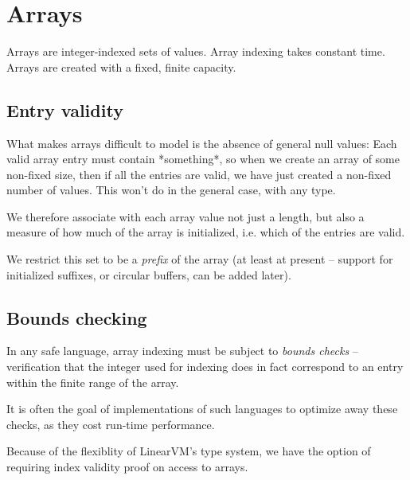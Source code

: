 \documentclass[a4paper]{book}
\begin{document}

\chapter{Arrays}

Arrays are integer-indexed sets of values.
Array indexing takes constant time.
Arrays are created with a fixed, finite capacity.

\section{Entry validity}

What makes arrays difficult to model is the absence of general null values:
Each valid array entry must contain *something*, so when we create an
array of some non-fixed size, then if all the entries are valid, we
have just created a non-fixed number of values.
This won't do in the general case, with any type.

We therefore associate with each array value not just a length, but
also a measure of how much of the array is initialized, i.e. which of
the entries are valid.

We restrict this set to be a \emph{prefix} of the array (at least at
present -- support for initialized suffixes, or circular buffers, can
be added later).

\section{Bounds checking}
In any safe language, array indexing must be subject to \emph{bounds checks}
-- verification that the integer used for indexing does in fact correspond to
an entry within the finite range of the array.

It is often the goal of implementations of such languages to optimize
away these checks, as they cost run-time performance.

Because of the flexiblity of LinearVM's type system, we have the option
of requiring index validity proof on access to arrays.

\end{document}
